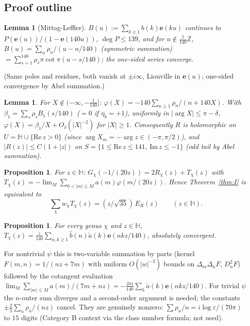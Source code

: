 \documentclass[11pt]{article}
\newtheorem{proposition}[theorem]{Proposition}
\newtheorem{lemma}[theorem]{Lemma}
\theoremstyle{definition}
\theoremstyle{plain}
\newcommand{\Z}{\mathbb{Z}}
\newcommand{\Hb}{\mathbb{H}}
\newcommand{\e}{\mathbf{e}}
\begin{document}
\subsection{Proof outline}
\begin{lemma}[Mittag-Leffler]
$B(u):=\sum_{k\ge1}b(k)\e(ku)$ continues to $P(\e(u))/(1-\e(140u))$, $\deg P\le139$, and for $u\notin\frac1{140}\Z$,
$B(u)=\sum_n\rho_n/(u-n/140)$ (symmetric summation) $=\sum_{s=1}^{140}\rho_s\pi\cot\pi(u-s/140)$; the one-sided series converge.
\end{lemma}
\noindent(Same poles and residues, both vanish at $\pm i\infty$, Liouville in $\e(u)$; one-sided convergence by Abel summation.)

\begin{lemma}
For $X\notin(-\infty,-\tfrac1{140}]$: $\varphi(X)=-140\sum_{n\ge1}\rho_n/(n+140X)$. With $\beta_1=\sum_s\rho_sB_1(s/140)$ ($=0$ if $\eta_b=+1$), uniformly in
$|\arg X|\le\pi-\delta$, $\varphi(X)=\beta_1/X+O_\delta(|X|^{-2})$ for $|X|\ge1$. Consequently $R$ is holomorphic on $U=\Hb\cup\{\mathrm{Re}\,z>0\}$ (since
$\arg X_m=-\arg z\in(-\pi,\pi/2)$), and $|R(z)|\le C(1+|z|)$ on $S=\{1\le\mathrm{Re}\,z\le141,\ \mathrm{Im}\,z\le-1\}$ (odd tail by Abel summation).
\end{lemma}

\begin{proposition}
For $z\in\Hb$: $G_\chi(-1/(20z))=2R_\chi(z)+T_\chi(z)$ with $T_\chi(z)=-\lim_M\sum_{0<|m|\le M}a(m)\varphi(m/(20z))$. Hence Theorem~\ref{thm:I} is equivalent to
\begin{equation}\label{eq:star}\textstyle
\sum_\chi w_\chi T_\chi(z)=(z/\sqrt{35})\,E_R(z)\qquad(z\in\Hb).
\end{equation}
\end{proposition}

\begin{proposition}
For every genus $\chi$ and $z\in\Hb$, $T_\chi(z)=\frac z{140}\sum_{n,k\ge1}\widehat b(n)\check a(k)\e(nkz/140)$, absolutely convergent.
\end{proposition}
\noindent For nontrivial $\psi$ this is two-variable summation by parts (kernel $F(m,n)=1/(nz+7m)$ with uniform $O(|w|^{-3})$ bounds on
$\Delta_m\Delta_nF$, $D_n^2F$) followed by the cotangent evaluation
$\lim_M\sum_{|m|\le M}a(m)/(7m+nz)=-\tfrac{2\pi i}{140}\sum_k\check a(k)\e(nkz/140)$. For trivial $\psi$ the $n$-outer sum diverges and a second-order
argument is needed; the constants $\pm\tfrac25\sum_n\rho_n/(nz)$ cancel. They are genuinely nonzero:
$\sum\rho_n/n=i\log\varepsilon/(70\pi)$ to $15$ digits (Category B context via the class number formula; not used).
\end{document}
